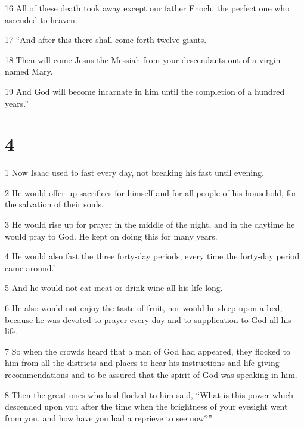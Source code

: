 \par 16 All of these death took away except our father Enoch, the perfect one who ascended to heaven. 

\par 17 “And after this there shall come forth twelve giants. 

\par 18 Then will come Jesus the Messiah from your descendants out of a virgin named Mary.

\par 19 And God will become incarnate in him until the completion of a hundred years.” 

\chapter{4}

\par 1 Now Isaac used to fast every day, not breaking his fast until evening. 

\par 2 He would offer up sacrifices for himself and for all people of his household, for the salvation of their souls. 

\par 3 He would rise up for prayer in the middle of the night, and in the daytime he would pray to God. He kept on doing this for many years. 

\par 4 He would also fast the three forty-day periods, every time the forty-day period came around.’ 

\par 5 And he would not eat meat or drink wine all his life long. 

\par 6 He also would not enjoy the taste of fruit, nor would he sleep upon a bed, because he was devoted to prayer every day and to supplication to God all his life. 

\par 7 So when the crowds heard that a man of God had appeared, they flocked to him from all the districts and places to hear his instructions and life-giving recommendations and to be assured that the spirit of God was speaking in him. 

\par 8 Then the great ones who had flocked to him said, “What is this power which descended upon you after the time when the brightness of your eyesight went from you, and how have you had a reprieve to see now?”

